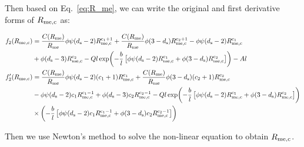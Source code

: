 \documentclass{article}
\begin{document}
\begin{itemize}
Then based on Eq.~\ref{eq:R_me}, we can write the original and first derivative forms of $R_{\rm me,c}$ as:

\begin{align}
  f_2(R_{\rm me,c}) &= \frac{C(R_{\rm me})}{R_{\rm me}} \phi \psi (d_{\rm s} -2) R_{\rm me,c}^{\rm c_1+1} + \frac{C(R_{\rm me})}{R_{\rm me}} \phi (3-d_{\rm s}) R_{\rm me,c}^{\rm c_2+1} - \phi \psi (d_{\rm s}-2) R_{\rm me,c}^{\rm c_1} \notag \\
  &+ \phi (d_{\rm s} -3) R_{\rm me,c}^{\rm c_2} - Q l \exp\biggl(- \frac{b}{l} \left[\phi \psi (d_{\rm s}-2) R_{\rm me,c}^{\rm c_1} + \phi (3-d_{\rm s}) R_{\rm me,c}^{\rm c_2}\right]\biggr) - A l \\
   f_2^ \prime (R_{\rm me,c}) &= \frac{C(R_{\rm me})}{R_{\rm me}} \phi \psi (d_{\rm s} -2) (c_1 +1) R_{\rm me,c}^{\rm c_1} + \frac{C(R_{\rm me})}{R_{\rm me}} \phi (3-d_{\rm s}) (c_2+1) R_{\rm me,c}^{\rm c_2} \notag \\
   &- \phi \psi (d_{\rm s}-2) c_1 R_{\rm me,c}^{\rm c_1-1} + \phi (d_{\rm s} -3) c_2 R_{\rm me,c}^{\rm c_2-1} \notag - Q l \exp\biggl(- \frac{b}{l} \left[\phi \psi (d_{\rm s}-2) R_{\rm me,c}^{\rm c_1} + \phi (3-d_{\rm s}) R_{\rm me,c}^{\rm c_2} \right]\biggr) \notag \\
   & \times \biggl(- \frac{b}{l} \left[\phi \psi (d_{\rm s}-2) c_1 R_{\rm me,c}^{\rm c_1-1} + \phi (3-d_{\rm s}) c_2 R_{\rm me,c}^{\rm c_2-1}\right]\biggr)
\end{align}

Then we use Newton's method to solve the non-linear equation to obtain $R_{\rm me,c}$.

\end{itemize}
\end{document}
